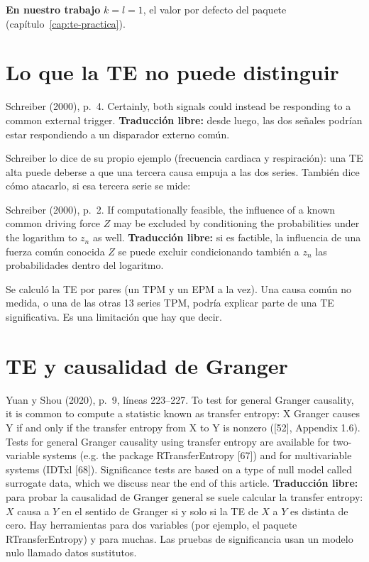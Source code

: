 \documentclass[11pt,openany]{book}
\begin{document}
\textbf{En nuestro trabajo} $k = l = 1$, el valor por defecto del paquete (capítulo~\ref{cap:te-practica}).

\section{Lo que la TE no puede distinguir}

\begin{cita}{Schreiber (2000), p.~4.}
Certainly, both signals could instead be responding to a common external trigger.
\tcblower
\textbf{Traducción libre:} desde luego, las dos señales podrían estar respondiendo a un disparador externo común.
\end{cita}

Schreiber lo dice de su propio ejemplo (frecuencia cardiaca y respiración): una TE alta puede deberse a que una tercera causa empuja a las dos series. También dice cómo atacarlo, si esa tercera serie se mide:

\begin{cita}{Schreiber (2000), p.~2.}
If computationally feasible, the influence of a known common driving force $Z$ may be excluded by conditioning the probabilities under the logarithm to $z_n$ as well.
\tcblower
\textbf{Traducción libre:} si es factible, la influencia de una fuerza común conocida $Z$ se puede excluir condicionando también a $z_n$ las probabilidades dentro del logaritmo.
\end{cita}

\begin{ojo}
Se calculó la TE por pares (un TPM y un EPM a la vez). Una causa común no medida, o una de las otras 13 series TPM, podría explicar parte de una TE significativa. Es una limitación que hay que decir.
\end{ojo}

\section{TE y causalidad de Granger}

\begin{cita}{Yuan y Shou (2020), p.~9, líneas 223--227.}
To test for general Granger causality, it is common to compute a statistic known as transfer entropy: X Granger causes Y if and only if the transfer entropy from X to Y is nonzero ([52], Appendix 1.6). Tests for general Granger causality using transfer entropy are available for two-variable systems (e.g. the package RTransferEntropy [67]) and for multivariable systems (IDTxl [68]). Significance tests are based on a type of null model called surrogate data, which we discuss near the end of this article.
\tcblower
\textbf{Traducción libre:} para probar la causalidad de Granger general se suele calcular la transfer entropy: $X$ causa a $Y$ en el sentido de Granger si y solo si la TE de $X$ a $Y$ es distinta de cero. Hay herramientas para dos variables (por ejemplo, el paquete RTransferEntropy) y para muchas. Las pruebas de significancia usan un modelo nulo llamado datos sustitutos.
\end{cita}
\end{document}
